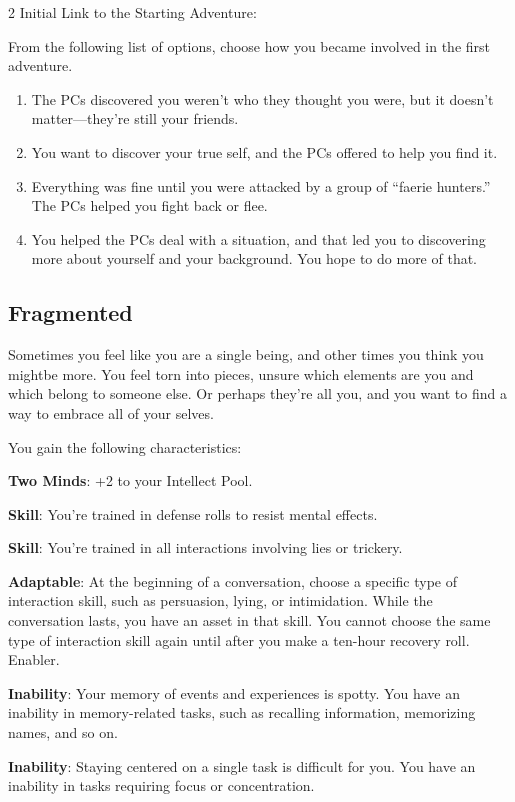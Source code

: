 \begin{multicols}{2}
Initial Link to the Starting Adventure:

From the following list of options, choose how you became involved in the first adventure.
\begin{enumerate} 
\item The PCs discovered you weren’t who they thought you were, but it doesn’t matter—they’re still your friends.
\item You want to discover your true self, and the PCs offered to help you find it.
\item Everything was fine until you were attacked by a group of “faerie hunters.” The PCs helped you fight back or flee.
\item You helped the PCs deal with a situation, and that led you to discovering more about yourself and your background. You hope to do more of that.
\end{enumerate}

\subsection{Fragmented}

Sometimes you feel like you are a single being, and other times you think you mightbe more. You feel torn into pieces, unsure which elements are you and which belong to someone else. Or perhaps they’re all you, and you want to find a way to embrace all of your selves.

You gain the following characteristics:

\textbf{Two Minds}: +2 to your Intellect Pool.

\textbf{Skill}: You’re trained in defense rolls to resist mental effects.

\textbf{Skill}: You’re trained in all interactions involving lies or trickery.

\textbf{Adaptable}: At the beginning of a conversation, choose a specific type of interaction skill, such as persuasion, lying, or intimidation. While the conversation lasts, you have an asset in that skill. You cannot choose the same type of interaction skill again until after you make a ten-hour recovery roll. Enabler.

\textbf{Inability}: Your memory of events and experiences is spotty. You have an inability in memory-related tasks, such as recalling information, memorizing names, and so on.

\textbf{Inability}: Staying centered on a single task is difficult for you. You have an inability in tasks requiring focus or concentration.


\end{multicols}
